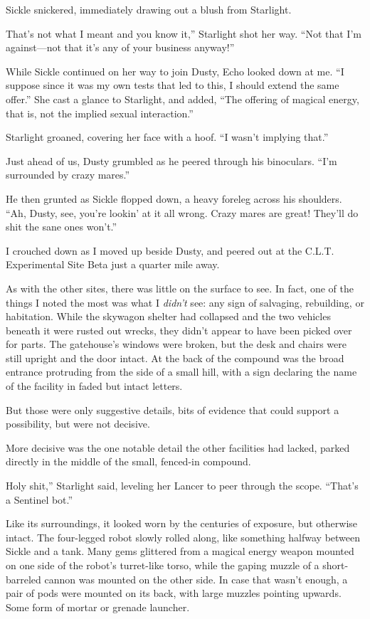 Sickle snickered, immediately drawing out a blush from Starlight.

\leavevmode{}That’s not what I meant and you know it,” Starlight shot her way. “Not that I’m against—not that it’s any of your business anyway!”

While Sickle continued on her way to join Dusty, Echo looked down at me. “I suppose since it was my own tests that led to this, I should extend the same offer.” She cast a glance to Starlight, and added, “The offering of magical energy, that is, not the implied sexual interaction.”

Starlight groaned, covering her face with a hoof. “I wasn’t implying that.”

Just ahead of us, Dusty grumbled as he peered through his binoculars. “I’m surrounded by crazy mares.”

He then grunted as Sickle flopped down, a heavy foreleg across his shoulders. “Ah, Dusty, see, you’re lookin’ at it all wrong. Crazy mares are great! They’ll do shit the sane ones won’t.”

I crouched down as I moved up beside Dusty, and peered out at the C.L.T. Experimental Site Beta just a quarter mile away.

As with the other sites, there was little on the surface to see. In fact, one of the things I noted the most was what I \textit{didn’t} see: any sign of salvaging, rebuilding, or habitation. While the skywagon shelter had collapsed and the two vehicles beneath it were rusted out wrecks, they didn’t appear to have been picked over for parts. The gatehouse’s windows were broken, but the desk and chairs were still upright and the door intact. At the back of the compound was the broad entrance protruding from the side of a small hill, with a sign declaring the name of the facility in faded but intact letters.

But those were only suggestive details, bits of evidence that could support a possibility, but were not decisive.

More decisive was the one notable detail the other facilities had lacked, parked directly in the middle of the small, fenced-in compound.

\leavevmode{}Holy shit,” Starlight said, leveling her Lancer to peer through the scope. “That’s a Sentinel bot.”

Like its surroundings, it looked worn by the centuries of exposure, but otherwise intact. The four-legged robot slowly rolled along, like something halfway between Sickle and a tank. Many gems glittered from a magical energy weapon mounted on one side of the robot’s turret-like torso, while the gaping muzzle of a short-barreled cannon was mounted on the other side. In case that wasn’t enough, a pair of pods were mounted on its back, with large muzzles pointing upwards. Some form of mortar or grenade launcher.

